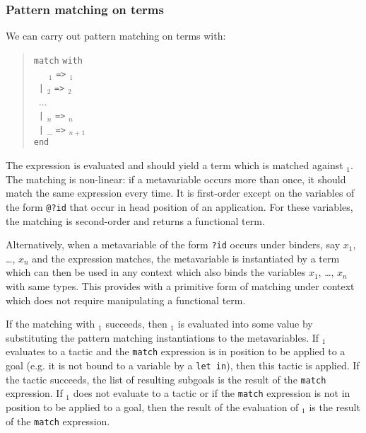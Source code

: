 \subsubsection[Pattern matching on terms]{Pattern matching on terms
}

We can carry out pattern matching on terms with:
\begin{quote}
{\tt match} {\tacexpr} {\tt with}\\
~~~{\cpattern}$_1$ {\tt =>} {\tacexpr}$_1$\\
~{\tt |} {\cpattern}$_2$ {\tt =>} {\tacexpr}$_2$\\
~...\\
~{\tt |} {\cpattern}$_n$ {\tt =>} {\tacexpr}$_n$\\
~{\tt |} {\tt \_} {\tt =>} {\tacexpr}$_{n+1}$\\
{\tt end}
\end{quote}
The expression {\tacexpr} is evaluated and should yield a term which
is matched against {\cpattern}$_1$. The matching is non-linear: if a
metavariable occurs more than once, it should match the same
expression every time. It is first-order except on the
variables of the form {\tt @?id} that occur in head position of an
application. For these variables, the matching is second-order and
returns a functional term.

Alternatively, when a metavariable of the form {\tt ?id} occurs under
binders, say $x_1$, \ldots, $x_n$ and the expression matches, the
metavariable is instantiated by a term which can then be used in any
context which also binds the variables $x_1$, \ldots, $x_n$ with
same types. This provides with a primitive form of matching
under context which does not require manipulating a functional term.

If the matching with {\cpattern}$_1$ succeeds, then {\tacexpr}$_1$ is
evaluated into some value by substituting the pattern matching
instantiations to the metavariables. If {\tacexpr}$_1$ evaluates to a
tactic and the {\tt match} expression is in position to be applied to
a goal (e.g. it is not bound to a variable by a {\tt let in}), then
this tactic is applied. If the tactic succeeds, the list of resulting
subgoals is the result of the {\tt match} expression. If
{\tacexpr}$_1$ does not evaluate to a tactic or if the {\tt match}
expression is not in position to be applied to a goal, then the result
of the evaluation of {\tacexpr}$_1$ is the result of the {\tt match}
expression.

